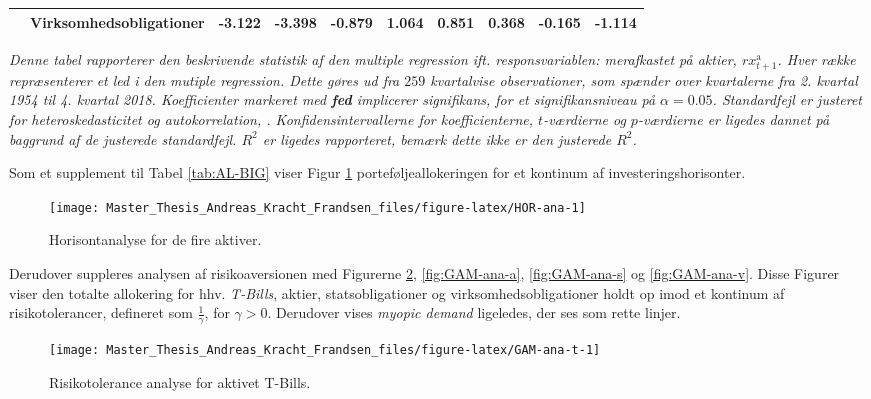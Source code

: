 \documentclass[
  a4paper,
  oneside]{memoir}
\begin{document}
\begin{table}[H]
{\begin{threeparttable}
\begin{tabular}[t]{llrrrrrrrr}
 & Virksomhedsobligationer & -3.122 & -3.398 & -0.879 & 1.064 & 0.851 & 0.368 & -0.165 & -1.114\\
\bottomrule
\end{tabular}
\begin{tablenotes}
\item \textit{Denne tabel rapporterer den beskrivende statistik af den multiple regression ift. responsvariablen: merafkastet på aktier, $rx_{t+1}^{\text{a}}$. Hver række repræsenterer et led i den mutiple regression. Dette gøres ud fra $259$ kvartalvise observationer, som spænder over kvartalerne fra 2. kvartal 1954 til 4. kvartal 2018. Koefficienter markeret med \textbf{fed} implicerer signifikans, for et signifikansniveau på $\alpha=0.05$. Standardfejl er justeret for heteroskedasticitet og autokorrelation, \citep{Newey1987}. Konfidensintervallerne for koefficienterne, $t$-værdierne og $p$-værdierne er ligedes dannet på baggrund af de justerede standardfejl. $R^2$ er ligedes rapporteret, bemærk dette ikke er den justerede $R^2$.}
\end{tablenotes}
\end{threeparttable}}
\end{table}

Som et supplement til Tabel \ref{tab:AL-BIG} viser Figur \ref{fig:HOR-ana} porteføljeallokeringen for et kontinum af investeringshorisonter.

\begin{figure}[H]

{\centering \texttt{[image: Master\_Thesis\_Andreas\_Kracht\_Frandsen\_files/figure-latex/HOR-ana-1]} 

}

\caption{Horisontanalyse for de fire aktiver.}\label{fig:HOR-ana}
\end{figure}

Derudover suppleres analysen af risikoaversionen med Figurerne \ref{fig:GAM-ana-t}, \ref{fig:GAM-ana-a}, \ref{fig:GAM-ana-s} og \ref{fig:GAM-ana-v}. Disse Figurer viser den totalte allokering for hhv. \emph{T-Bills}, aktier, statsobligationer og virksomhedsobligationer holdt op imod et kontinum af risikotolerancer, defineret som \(\tfrac{1}{\gamma}\), for \(\gamma>0\). Derudover vises \emph{myopic demand} ligeledes, der ses som rette linjer.

\begin{figure}[H]

{\centering \texttt{[image: Master\_Thesis\_Andreas\_Kracht\_Frandsen\_files/figure-latex/GAM-ana-t-1]} 

}

\caption{Risikotolerance analyse for aktivet T-Bills.}\label{fig:GAM-ana-t}
\end{figure}
\end{document}
